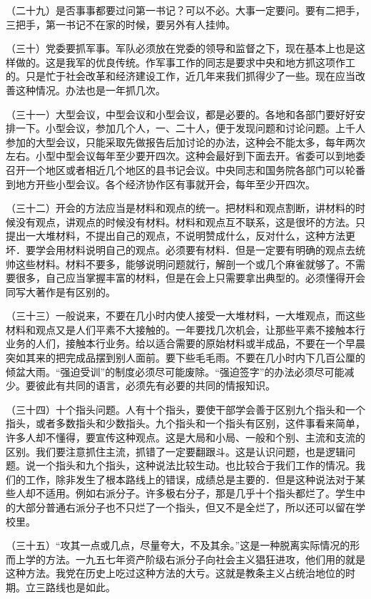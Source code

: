 （二十九）是否事事都要过问第一书记？可以不必。大事一定要问。要有二把手，三把手，第一书记不在家的时候，要另外有人挂帅。

（三十）党委要抓军事。军队必须放在党委的领导和监督之下，现在基本上也是这样做的。这是我军的优良传统。作军事工作的同志是要求中央和地方抓这项作工的。只是忙于社会改革和经济建设工作，近几年来我们抓得少了一些。现在应当改善这种情况。办法也是一年抓几次。

（三十一）大型会议，中型会议和小型会议，都是必要的。各地和各部门要好好安排一下。小型会议，参加几个人，一、二十人，便于发现问题和讨论问题。上千人参加的大型会议，只能采取先做报告后加讨论的办法，这种会不能太多，每年两次左右。小型中型会议每年至少要开四次。这种会最好到下面去开。省委可以到地委召开一个地区或者相近几个地区的县书记会议。中央同志和国务院各部门可以轮番到地方开些小型会议。各个经济协作区有事就开会，每年至少开四次。

（三十二）开会的方法应当是材料和观点的统一。把材料和观点割断，讲材料的时候没有观点，讲观点的时候没有材料。材料和观点互不联系，这是很坏的方法。只提出一大堆材料，不提出自己的观点，不说明赞成什么，反对什么，这种方法更坏．要学会用材料说明自己的观点。必须要有材料．但是一定要有明确的观点去统帅这些材料。材料不要多，能够说明问题就行，解剖一个或几个麻雀就够了。不需要很多，自己应当掌握丰富的材料，但是在会上只需要拿出典型的。必须懂得开会同写大著作是有区别的。

（三十三）一般说来，不要在几小时内使人接受一大堆材料，一大堆观点，而这些材料和观点又是人们平素不大接触的。一年要找几次机会，让那些平素不接触本行业务的人们，接触本行业务。给以适合需要的原始材料或半成品，不要在一个早晨突如其来的把完成品摆到别人面前。要下些毛毛雨。不要在几小时内下几百公厘的倾盆大雨。“强迫受训”的制度必须尽可能废除。“强迫签字”的办法必须尽可能减少。要彼此有共同的语言，必须先有必要的共同的情报知识。

（三十四）十个指头问题。人有十个指头，要使干部学会善于区别九个指头和一个指头，或者多数指头和少数指头。九个指头和一个指头有区别，这件事看来简单，许多人却不懂得，要宣传这种观点。这是大局和小局、一般和个别、主流和支流的区别。我们要注意抓住主流，抓错了一定要翻跟斗。这是认识问题，也是逻辑问题。说一个指头和九个指头，这种说法比较生动。也比较合于我们工作的情况。我们的工作，除非发生了根本路线上的错误，成绩总是主要的．但是这种说法对于某些人却不适用。例如右派分子。许多极右分子，那是几乎十个指头都烂了。学生中的大部分普通右派分子也不只烂了一个指头，但又不是全烂了，所以还可以留在学校里。

（三十五）“攻其一点或几点，尽量夸大，不及其余。”这是一种脱离实际情况的形而上学的方法。一九五七年资产阶级右派分子向社会主义猖狂进攻，他们用的就是这种方法。我党在历史上吃过这种方法的大亏。这就是教条主义占统治地位的时期。立三路线也是如此。

